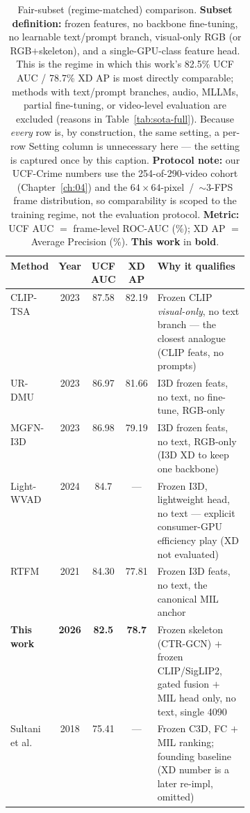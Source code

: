\begin{table}[p]
\centering
\singlespacing
\caption[Fair-subset (regime-matched) comparison]{Fair-subset (regime-matched)
comparison. \textbf{Subset definition:}
frozen features, no backbone fine-tuning, no learnable text/prompt branch,
visual-only RGB (or RGB$+$skeleton), and a single-GPU-class feature head. This
is the regime in which this work's 82.5\% UCF AUC / 78.7\% XD AP is most
directly comparable; methods with text/prompt branches, audio, MLLMs, partial
fine-tuning, or video-level evaluation are excluded (reasons in
Table~\ref{tab:sota-full}). Because \emph{every} row is, by construction, the
same setting, a per-row Setting column is unnecessary here --- the setting is
captured once by this caption. \textbf{Protocol note:} our UCF-Crime numbers
use the 254-of-290-video cohort (Chapter~\ref{ch:04}) and the
$64\times64$-pixel~/~${\sim}3$-FPS frame distribution, so comparability is
scoped to the training regime, not the evaluation protocol.
\textbf{Metric:} UCF AUC $=$ frame-level ROC-AUC
(\%); XD AP $=$ Average Precision (\%). \textbf{This work} in \textbf{bold}.}
\label{tab:sota-fair}
\small
\setlength{\tabcolsep}{5pt}
\begin{tabular}{l c c c p{0.40\linewidth}}
\toprule
Method & Year & UCF AUC & XD AP & Why it qualifies \\
\midrule
CLIP-TSA~\cite{joo2023cliptsa} & 2023 & 87.58 & 82.19 & Frozen CLIP \emph{visual-only}, no text branch --- the closest analogue (CLIP feats, no prompts) \\
UR-DMU~\cite{zhou2023urdmu}    & 2023 & 86.97 & 81.66 & I3D frozen feats, no text, no fine-tune, RGB-only \\
MGFN-I3D~\cite{chen2023mgfn}   & 2023 & 86.98 & 79.19 & I3D frozen feats, no text, RGB-only (I3D XD to keep one backbone) \\
Light-WVAD~\cite{wang2024lightwvad} & 2024 & 84.7  & ---   & Frozen I3D, lightweight head, no text --- explicit consumer-GPU efficiency play (XD not evaluated) \\
RTFM~\cite{tian2021rtfm}       & 2021 & 84.30 & 77.81 & Frozen I3D feats, no text, the canonical MIL anchor \\
\textbf{This work} & \textbf{2026} & \textbf{82.5} & \textbf{78.7} & Frozen skeleton (CTR-GCN) $+$ frozen CLIP/SigLIP2, gated fusion $+$ MIL head only, no text, single 4090 \\
Sultani et al.~\cite{sultani2018ucfcrime} & 2018 & 75.41 & ---   & Frozen C3D, FC $+$ MIL ranking; founding baseline (XD number is a later re-impl, omitted) \\
\bottomrule
\end{tabular}


\end{table}
